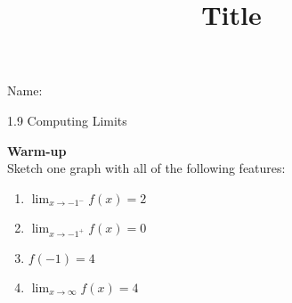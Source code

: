 \documentclass[12pt]{article}
\title{Title}
\begin{document}
 Name:
 \begin{center}\large{1.9 Computing Limits}\end{center}

\begin{tcolorbox}
\textbf{Warm-up} \\
Sketch one graph with all of the following features:
	\begin{enumerate}
	\item $\displaystyle \lim_{x\to -1^-} f(x)=2$\\
	\item $\displaystyle \lim_{x\to -1^+} f(x)=0$
	\item $\displaystyle f(-1)=4$
	\item $\displaystyle \lim_{x\to \infty}f(x)=4$
	\end{enumerate}

\end{tcolorbox}
\end{document}
